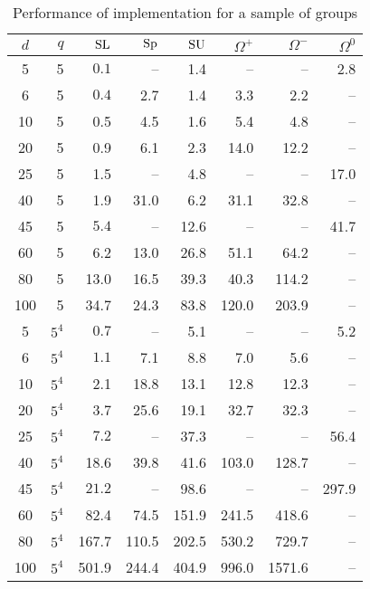\documentclass[12pt]{article}
\def\SL{{\rm SL}}
\def\Sp{{\rm Sp}}
\def\SU{{\rm SU}}
\begin{document}
\begin{table}[htp]
\label{table1}
\begin{center}
\begin{tabular}
{|c|r|r|r|r|r|r|r|} \hline
$d$ & $q$ & $\SL$ & $\Sp$ & $\SU$ & $\Omega^+$ & $\Omega^-$ & $\Omega^0$  
\rule{0cm}{2.5ex}\\ \hline
5 & 5  & $0.1$ & -- & 1.4 & -- & -- & 2.8 \rule{0cm}{2.5ex}\\ \hline
6 & 5  & $0.4$ & 2.7 & 1.4 & 3.3 & 2.2 & -- \rule{0cm}{2.5ex}\\ \hline
10  & 5  & 0.5 & 4.5 & 1.6 & 5.4 & 4.8 & -- \rule{0cm}{2.5ex}\\ \hline
20  & 5  & 0.9 & 6.1 & 2.3 & 14.0 & 12.2 & -- \rule{0cm}{2.5ex}\\ \hline
25 & 5  & 1.5 & -- & 4.8 & -- & -- & 17.0  \rule{0cm}{2.5ex}\\ \hline
40  & 5  & 1.9 & 31.0 & 6.2 & 31.1 & 32.8 & -- \rule{0cm}{2.5ex}\\ \hline
45 & 5  & $5.4$ & -- & 12.6 &    -- & -- & 41.7 \rule{0cm}{2.5ex}\\ \hline
60  & 5  & 6.2 & 13.0 & 26.8 & 51.1 & 64.2 & -- \rule{0cm}{2.5ex}\\ \hline
80  & 5  & 13.0 & 16.5 & 39.3 & 40.3 & 114.2 & -- \rule{0cm}{2.5ex}\\ \hline
100  & 5  & 34.7 & 24.3 & 83.8 & 120.0 & 203.9 & -- \rule{0cm}{2.5ex}\\ \hline
5 & $5^4$  & $0.7$ & -- & 5.1 & -- & -- & 5.2 \rule{0cm}{2.5ex}\\ \hline
6 & $5^4$ & $1.1$ & 7.1 & 8.8 & 7.0 & 5.6 & -- \rule{0cm}{2.5ex}\\ \hline
10  & $5^4$  & 2.1 & 18.8 & 13.1  & 12.8 & 12.3 & -- \rule{0cm}{2.5ex}\\ \hline
20  & $5^4$  & 3.7 & 25.6 & 19.1 & 32.7 & 32.3 & -- \rule{0cm}{2.5ex}\\ \hline
25 & $5^4$  & $7.2$ & -- & 37.3 & -- & -- & 56.4 \rule{0cm}{2.5ex}\\ \hline
40  & $5^4$  & 18.6 & 39.8 & 41.6 & 103.0 & 128.7 & -- \rule{0cm}{2.5ex}\\ \hline
45 & $5^4$  & $21.2$ & -- & 98.6 & -- & -- & 297.9 \rule{0cm}{2.5ex}\\ \hline
60  & $5^4$  & 82.4 & 74.5 & 151.9 & 241.5 & 418.6 & -- \rule{0cm}{2.5ex}\\ \hline
80  & $5^4$  & 167.7 & 110.5 & 202.5 & 530.2 & 729.7 & -- \rule{0cm}{2.5ex}\\ \hline
100  & $5^4$  & 501.9 & 244.4 & 404.9 & 996.0 & 1571.6 & -- \rule{0cm}{2.5ex}\\ \hline
\end{tabular}
\end{center}
\caption{Performance of implementation for a sample of groups}
\end{table}
\end{document}
